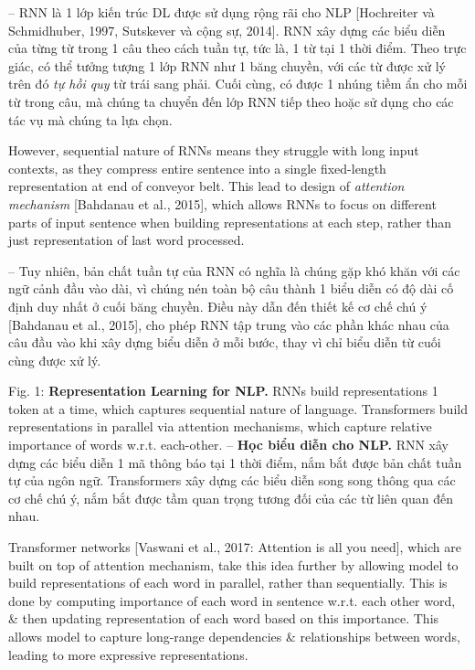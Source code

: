\documentclass{article}
\begin{document}
\begin{itemize}
\begin{itemize}
        -- RNN là 1 lớp kiến trúc DL được sử dụng rộng rãi cho NLP [Hochreiter và Schmidhuber, 1997, Sutskever và cộng sự, 2014]. RNN xây dựng các biểu diễn của từng từ trong 1 câu theo cách tuần tự, tức là, 1 từ tại 1 thời điểm. Theo trực giác, có thể tưởng tượng 1 lớp RNN như 1 băng chuyền, với các từ được xử lý trên đó {\it tự hồi quy} từ trái sang phải. Cuối cùng, có được 1 nhúng tiềm ẩn cho mỗi từ trong câu, mà chúng ta chuyển đến lớp RNN tiếp theo hoặc sử dụng cho các tác vụ mà chúng ta lựa chọn.

        However, sequential nature of RNNs means they struggle with long input contexts, as they compress entire sentence into a single fixed-length representation at end of conveyor belt. This lead to design of {\it attention mechanism} [Bahdanau et al., 2015], which allows RNNs to focus on different parts of input sentence when building representations at each step, rather than just representation of last word processed.

        -- Tuy nhiên, bản chất tuần tự của RNN có nghĩa là chúng gặp khó khăn với các ngữ cảnh đầu vào dài, vì chúng nén toàn bộ câu thành 1 biểu diễn có độ dài cố định duy nhất ở cuối băng chuyền. Điều này dẫn đến thiết kế cơ chế chú ý [Bahdanau et al., 2015], cho phép RNN tập trung vào các phần khác nhau của câu đầu vào khi xây dựng biểu diễn ở mỗi bước, thay vì chỉ biểu diễn từ cuối cùng được xử lý.

        {\sf Fig. 1: {\bf Representation Learning for NLP.} RNNs build representations 1 token at a time, which captures sequential nature of language. Transformers build representations in parallel via attention mechanisms, which capture relative importance of words w.r.t. each-other.} -- {\bf Học biểu diễn cho NLP.} RNN xây dựng các biểu diễn 1 mã thông báo tại 1 thời điểm, nắm bắt được bản chất tuần tự của ngôn ngữ. Transformers xây dựng các biểu diễn song song thông qua các cơ chế chú ý, nắm bắt được tầm quan trọng tương đối của các từ liên quan đến nhau.

        Transformer networks [Vaswani et al., 2017: Attention is all you need], which are built on top of attention mechanism, take this idea further by allowing model to build representations of each word in parallel, rather than sequentially. This is done by computing importance of each word in sentence w.r.t. each other word, \& then updating representation of each word based on this importance. This allows model to capture long-range dependencies \& relationships between words, leading to more expressive representations.


\end{itemize}
\end{itemize}
\end{document}
